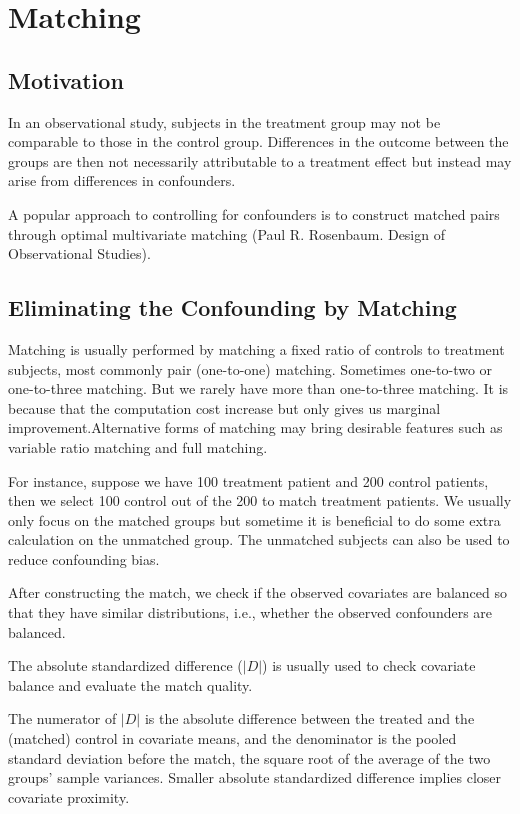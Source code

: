 \section{Matching}
\subsection{Motivation}
In an observational study, subjects in the treatment group may
not be comparable to those in the control group. Differences in
the outcome between the groups are then not necessarily
attributable to a treatment effect but instead may arise from
differences in confounders.

A popular approach to controlling for
confounders is to construct matched pairs through optimal
multivariate matching (Paul R. Rosenbaum. Design of Observational Studies).

\subsection{Eliminating the Confounding by Matching}
Matching is usually performed by matching a fixed ratio of
controls to treatment subjects, most commonly pair (one-to-one)
matching. Sometimes one-to-two or one-to-three matching. But we rarely have more than one-to-three matching. It is because that the computation cost increase but only gives us marginal improvement.Alternative forms of matching may bring desirable features such as variable ratio matching and full matching.

For instance, suppose we have 100 treatment patient and 200 control patients, then we select 100 control out of the 200 to match treatment patients. We usually only focus on the matched groups but sometime it is beneficial to do some extra calculation on the unmatched group. The unmatched subjects can also be used to reduce confounding
bias.

After constructing the match, we check if the observed
covariates are balanced so that they have similar distributions,
i.e., whether the observed confounders are balanced.

The absolute standardized difference ($|D|$) is usually used to
check covariate balance and evaluate the match quality.

The numerator of $|D|$ is the absolute difference between the
treated and the (matched) control in covariate means, and the
denominator is the pooled standard deviation before the match,
the square root of the average of the two groups' sample
variances. Smaller absolute standardized difference implies closer
covariate proximity.

